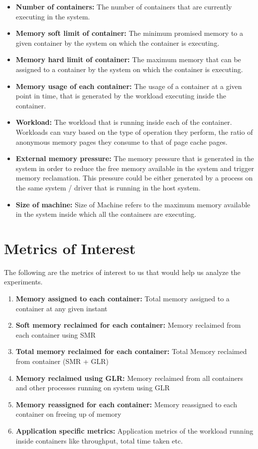     \begin{itemize}
      \item \textbf{Number of containers:} The number of containers that are currently executing in the system.
      \item \textbf{Memory soft limit of container:} The minimum promised memory to a given container by the system on which the 
container is executing.
      \item \textbf{Memory hard limit of container:} The maximum memory that can be assigned to a container by the system on which the 
container is executing.
      \item \textbf{Memory usage of each container:} The usage of a container at a given point in time, that is generated by the workload 
executing inside the container.
      \item \textbf{Workload:} The workload that is running inside each of the container. Workloads can vary based on the type of operation 
they perform, the ratio of anonymous memory pages they consume to that of page cache pages.  
      \item \textbf{External memory pressure:} The memory pressure that is generated in the system in order to reduce the free memory 
available in the system and trigger memory reclamation. This pressure could be either generated by a process on the same system / driver 
that is running in the host system.
      \item \textbf{Size of machine:} Size of Machine refers to the maximum memory available in the system inside which all the 
containers are executing.      
    \end{itemize}  
  
  \section{Metrics of Interest}
  
    The following are the metrics of interest to us that would help us analyze the experiments.
      
	\begin{enumerate}
	 \item \textbf{Memory assigned to each container:} Total memory assigned to a container at any given instant
	 \item \textbf{Soft memory reclaimed for each container:} Memory reclaimed from each container using SMR
	 \item \textbf{Total memory reclaimed for each container:} Total Memory reclaimed from container (SMR + GLR)
	 \item \textbf{Memory reclaimed using GLR:} Memory reclaimed from all containers and other processes running on system using GLR
	 \item \textbf{Memory reassigned for each container:} Memory reassigned to each container on freeing up of memory
	 \item \textbf{Application specific metrics:} Application metrics of the workload running inside containers like throughput, total 
time taken etc.
	\end{enumerate}
  
